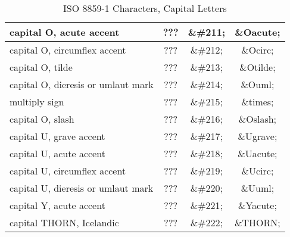 \begin{table}[htbp]
\begin{center}
\begin{tabular}{lc>{\ttfamily}c>{\ttfamily}c}
      capital O, acute accent            & ??? & \&\#211; & \&Oacute; \\
      \hline
      capital O, circumflex accent       & ??? & \&\#212; & \&Ocirc; \\
      capital O, tilde                   & ??? & \&\#213; & \&Otilde; \\
      capital O, dieresis or umlaut mark & ??? & \&\#214; & \&Ouml; \\
      multiply sign                      & ??? & \&\#215; & \&times; \\
      \hline
      capital O, slash                   & ??? & \&\#216; & \&Oslash; \\
      capital U, grave accent            & ??? & \&\#217; & \&Ugrave; \\
      capital U, acute accent            & ??? & \&\#218; & \&Uacute; \\
      capital U, circumflex accent       & ??? & \&\#219; & \&Ucirc; \\
      \hline
      capital U, dieresis or umlaut mark & ??? & \&\#220; & \&Uuml; \\
      capital Y, acute accent            & ??? & \&\#221; & \&Yacute; \\
      capital THORN, Icelandic           & ??? & \&\#222; & \&THORN; \\
    \end{tabular}
    \caption{ISO 8859-1 Characters, Capital Letters}
    \label{t:ISO8859-1:capital}
  \end{center}
\end{table}

